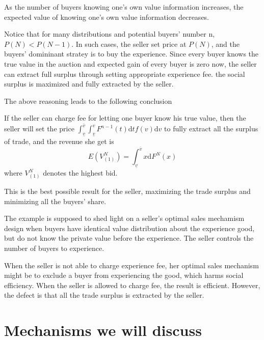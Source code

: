 \begin{lemma}
As the number of buyers knowing one's own value information increases, the expected value of knowing one's own value information decreases. 
\end{lemma}
Notice that for many distributions and potential buyers' number n, $P(N) < P(N-1)$. In such cases, the seller set price at $P(N)$, and 
the buyers' domininant stratey is to buy the experience. 
Since every buyer knows the true value in the auction and expected gain of every buyer is zero now, the seller can extract full surplus through setting appropriate experience fee. the 
social surplus is maximized and fully extracted by the seller. 



The above reasoning leads to the following conclusion

\begin{thm}

 If the seller can charge fee for letting one buyer know his true value, then the seller will set the price
 $ \int_{\underline{v}}^{\overline{v}}\int_{\underline{v}}^v F^{n-1}(t)\mathrm{d}tf(v)\mathrm{d}v$ to fully extract all the surplus of trade, and the revenue she get is 
 \begin{equation}
 E(V_{(1)}^N)=\int_{\underline{v}}^{\overline{v}} x\mathrm{d}F^N(x) 
 \end{equation}
where $V_{(1)}^N$ denotes the highest bid. 
\end{thm}
 This is the best possible result for the seller, maximizing the trade surplus and minimizing all the buyers' share. 


The example is supposed to shed light on a seller's optimal
sales mechamism design when buyers have identical value distribution about the
experience good, but do not know the private value before the experience. The seller controls the number of buyers to experience. 

When the seller is not able to charge experience fee, her optimal sales mechanism might be to exclude a buyer from experiencing the good, which harms social
 efficiency. When the seller is allowed to charge fee, the result is efficient. However, the defect is that
 all the trade surplus is extracted by the seller. 




 

 

\section{Mechanisms we will discuss}

